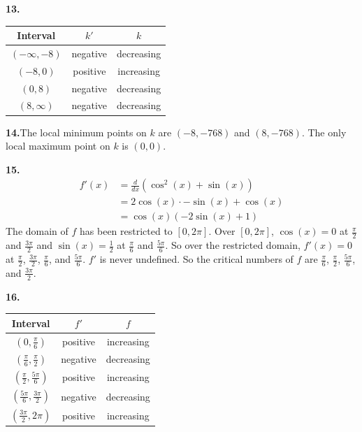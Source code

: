 \documentclass[10pt,oneside,]{book}
\theoremstyle{plain}
\theoremstyle{definition}
\numberwithin{equation}{section}
\newcommand{\fe}[2]{#1\mathopen{}\left(#2\right)\mathclose{}}
\newcommand{\cinterval}[2]{\left[#1,#2\right]}
\newcommand{\ointerval}[2]{\left(#1,#2\right)}
\newcommand{\point}[2]{\left(#1,#2\right)}
\newcommand{\fd}[1]{#1'}
\newcommand{\lzoo}[2]{{\frac{d}{d#1}}{\left(#2\right)}}
\begin{document}
\par\smallskip
\noindent\textbf{13.}\quad{}\begin{tabular}{ccc}
\toprule
Interval&\(\fd{k}\)&\(k\)\\
\midrule
\(\ointerval{-\infty}{-8}\)&negative&decreasing\\
\midrule
\(\ointerval{-8}{0}\)&positive&increasing\\
\midrule
\(\ointerval{0}{8}\)&negative&decreasing\\
\midrule
\(\ointerval{8}{\infty}\)&negative&decreasing\\
\bottomrule
\end{tabular}
\par\smallskip
\noindent\textbf{14.}\quad{}The local minimum points on \(k\) are \(\point{-8}{-768}\) and \(\point{8}{-768}\).  The only local maximum point on \(k\) is \(\point{0}{0}\).%
\par\smallskip
\noindent\textbf{15.}\quad{}\begin{align*}
\fe{\fd{f}}{x}&=\lzoo{x}{\fe{\cos^2}{x}+\fe{\sin}{x}}\\
&=2\fe{\cos}{x}\cdot-\fe{\sin}{x}+\fe{\cos}{x}\\
&=\fe{\cos}{x}\left(-2\fe{\sin}{x}+1\right)
\end{align*}The domain of \(f\) has been restricted to \(\cinterval{0}{2\pi}\).  Over \(\cinterval{0}{2\pi}\), \(\fe{\cos}{x}=0\) at \(\frac{\pi}{2}\) and \(\frac{3\pi}{2}\) and \(\fe{\sin}{x}=\frac{1}{2}\) at \(\frac{\pi}{6}\) and \(\frac{5\pi}{6}\).  So over the restricted domain, \(\fe{\fd{f}}{x}=0\) at \(\frac{\pi}{2}\), \(\frac{3\pi}{2}\), \(\frac{\pi}{6}\), and \(\frac{5\pi}{6}\). \(\fd{f}\) is never undefined.  So the critical numbers of \(f\) are \(\frac{\pi}{6}\), \(\frac{\pi}{2}\), \(\frac{5\pi}{6}\), and \(\frac{3\pi}{2}\).%
\par\smallskip
\noindent\textbf{16.}\quad{}\begin{tabular}{ccc}
\toprule
Interval&\(\fd{f}\)&\(f\)\\
\midrule
\(\ointerval{0}{\frac{\pi}{6}}\)&positive&increasing\\
\midrule
\(\ointerval{\frac{\pi}{6}}{\frac{\pi}{2}}\)&negative&decreasing\\
\midrule
\(\ointerval{\frac{\pi}{2}}{\frac{5\pi}{6}}\)&positive&increasing\\
\midrule
\(\ointerval{\frac{5\pi}{6}}{\frac{3\pi}{2}}\)&negative&decreasing\\
\midrule
\(\ointerval{\frac{3\pi}{2}}{2\pi}\)&positive&increasing\\
\midrule
\end{tabular}
\end{document}
